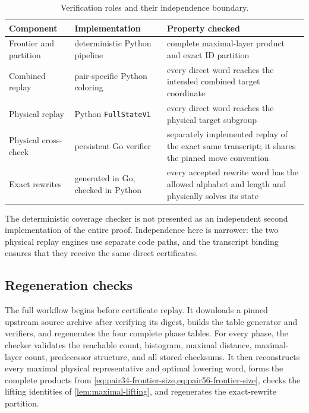 \begin{table}[t]
\centering
\caption{Verification roles and their independence boundary.}
\label{tab:verification-roles}
\small
\renewcommand{\arraystretch}{1.12}
\begin{tabularx}{\textwidth}{@{}
  >{\raggedright\arraybackslash}p{}
  >{\raggedright\arraybackslash}p{}
  >{\raggedright\arraybackslash}X@{}}
\toprule
Component & Implementation & Property checked\\
\midrule
Frontier and partition & deterministic Python pipeline & complete
maximal-layer product and exact ID partition\\
Combined replay & pair-specific Python coloring & every direct word reaches
the intended combined target coordinate\\
Physical replay & Python \texttt{FullStateV1} & every direct word reaches the
physical target subgroup\\
Physical cross-check & persistent Go verifier & separately implemented replay
of the exact same transcript; it shares the pinned move convention\\
Exact rewrites & generated in Go, checked in Python & every accepted rewrite
word has the allowed alphabet and length and physically solves its state\\
\bottomrule
\end{tabularx}
\end{table}

The deterministic coverage checker is not presented as an independent second
implementation of the entire proof.  Independence here is narrower: the two
physical replay engines use separate code paths, and the transcript binding
ensures that they receive the same direct certificates.

\subsection{Regeneration checks}

The full workflow begins before certificate replay.  It downloads a pinned
upstream source archive after verifying its digest, builds the table generator
and verifiers, and regenerates the four complete phase tables.  For every
phase, the checker validates the reachable count, histogram, maximal distance,
maximal-layer count, predecessor structure, and all stored checksums.  It then
reconstructs every maximal physical representative and optimal lowering word,
forms the complete products from \cref{eq:pair34-frontier-size,eq:pair56-frontier-size},
checks the lifting identities of \cref{lem:maximal-lifting}, and regenerates
the exact-rewrite partition.

